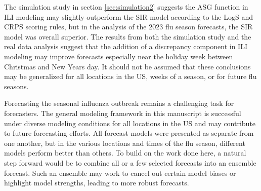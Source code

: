 The simulation study in section \ref{sec:simulation2} suggests the ASG 
function in ILI modeling may slightly outperform the SIR model according to 
the LogS and CRPS scoring rules, but in the analysis of the 2023 flu season 
forecasts, the SIR model was overall superior. The results from both the 
simulation study and the real data analysis suggest that the addition of a 
discrepancy component in ILI modeling may improve forecasts especially near 
the holiday week between Christmas and New Years day. It should not be assumed 
that these conclusions may be generalized for all locations in the US, weeks 
of a season, or for future flu seasons. 

Forecasting the seasonal influenza outbreak remains a challenging task for 
forecasters. The general modeling framework in this manuscript is successful 
under diverse modeling conditions for all locations in the US and may 
contribute to future forecasting efforts. All forecast models were presented 
as separate from one another, but in the various locations and times of the 
flu season, different models perform better than others. To build on the work 
done here, a natural step forward would be to combine all or a few selected 
forecasts into an ensemble forecast. Such an ensemble may work to cancel out 
certain model biases or highlight model strengths, leading to more robust 
forecasts. 
